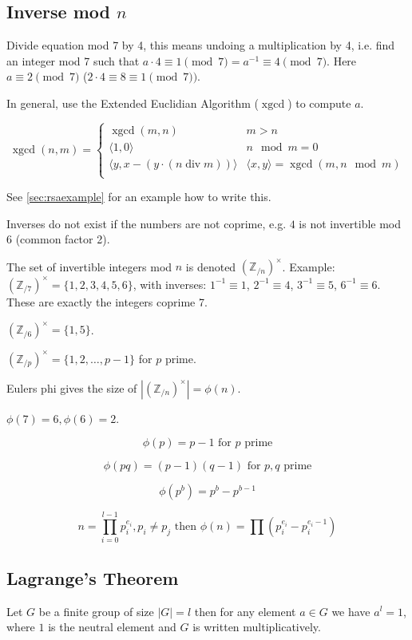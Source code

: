 \documentclass{article}
\newcommand{\ZZ}{\mathbb{Z}}
\newcommand{\egcd}{\operatorname{xgcd}}
\newcommand{\xgcd}{\operatorname{xgcd}}
\newcommand{\ZZx}[1]{(\ZZ_{/#1})^\times}
\begin{document}
\subsection{Inverse mod $n$}

Divide equation mod 7 by 4, this means undoing a multiplication by 4, i.e. find
an integer mod 7 such that $a \cdot 4 \equiv 1 \pmod 7 = a^{-1} \equiv 4 \pmod
7$. Here $a \equiv 2 \pmod{7}$ ($2 \cdot 4 \equiv 8 \equiv 1 \pmod{7})$.

In general, use the Extended Euclidian Algorithm ($\xgcd$) to compute $a$.

\[
  \egcd(n,m) = \begin{cases}
    \egcd(m,n) & m > n \\
    \langle 1,0 \rangle & n \mod m = 0 \\
    \langle y, x - (y \cdot (n \operatorname{div} m))\rangle & \langle x, y \rangle = \egcd(m, n \mod m) \\
  \end{cases}
\]

See \ref{sec:rsaexample} for an example how to write this.

Inverses do not exist if the numbers are not coprime, e.g. $4$ is not invertible
mod 6 (common factor 2).

The set of invertible integers mod $n$ is denoted $\ZZx{n}$. Example: 
$\ZZx{7} = \{1, 2, 3, 4, 5, 6\}$, with inverses: $1^{-1} \equiv 1$, 
$2^{-1} \equiv 4$, $3^{-1} \equiv 5$, $6^{-1} \equiv 6$. These
are exactly the integers coprime 7.

$\ZZx{6} = \{1, 5\}$.

$\ZZx{p} = \{1, 2, \dots, p-1\}$ for $p$ prime.

Eulers phi gives the size of $|\ZZx{n}| = \phi(n)$.

$\phi(7) = 6, \phi(6) = 2$.

\[ \phi(p) = p-1 \text{ for $p$ prime} \]

\[ \phi(pq) = (p-1)(q-1) \text{ for $p, q$ prime}\]

\[ \phi(p^b) = p^b - p^{b-1} \]

\[ n = \prod\limits_{i=0}^{l-1} p_i^{e_i}, p_i \ne p_j \text{ then } \phi(n) = \prod (p_i^{e_i} - p_i^{e_i -1}) \]

\subsection{Lagrange's Theorem}

Let $G$ be a finite group of size $|G| = l$ then for any element $a \in G$ we have $a^l = 1$, where
$1$ is the neutral element and $G$ is written multiplicatively.
\end{document}

